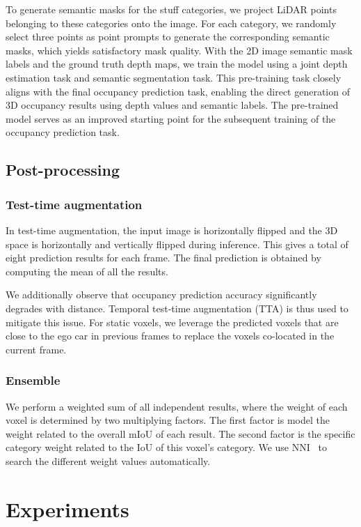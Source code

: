 \documentclass[10pt,twocolumn,letterpaper]{article}
\begin{document}
To generate semantic masks for the stuff categories, we project LiDAR points belonging to these categories onto the image. For each category, we randomly select three points as point prompts to generate the corresponding semantic masks, which yields satisfactory mask quality. With the 2D image semantic mask labels and the ground truth depth maps, we train the model using a joint depth estimation task and semantic segmentation task. This pre-training task closely aligns with the final occupancy prediction task, enabling the direct generation of 3D occupancy results using depth values and semantic labels. The pre-trained model serves as an improved starting point for the subsequent training of the occupancy prediction task.

\subsection{Post-processing}\label{PP}

\subsubsection{Test-time augmentation}
In test-time augmentation, the input image is horizontally flipped and the 3D space is horizontally and vertically flipped during inference. This gives a total of eight prediction results for each frame. The final prediction is obtained by computing the mean of all the results.

We additionally observe that occupancy prediction accuracy significantly degrades with distance. Temporal test-time augmentation (TTA) is thus used to mitigate this issue. For static voxels, we leverage the predicted voxels that are close to the ego car in previous frames to replace the voxels co-located in the current frame.

\subsubsection{Ensemble}
We perform a weighted sum of all independent results, where the weight of each voxel is determined by two multiplying factors. The first factor is model the weight related to the overall mIoU of each result. The second factor is the specific category weight related to the IoU of this voxel's category. We use NNI~\cite{mnni} to search the different weight values automatically.

\section{Experiments}
\end{document}
